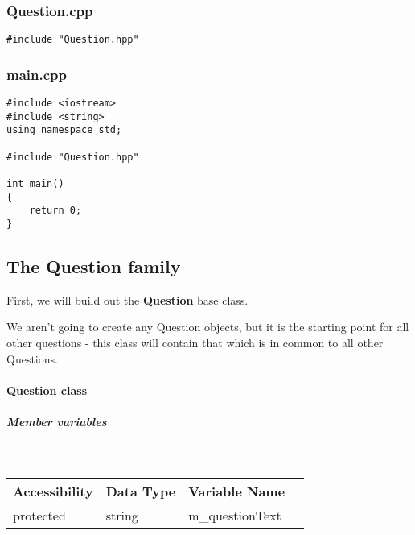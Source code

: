\documentclass[a4paper,12pt]{book}
\begin{document}
            
                \subsubsection*{Question.cpp}
\begin{lstlisting}[style=code]
#include "Question.hpp"
\end{lstlisting}

            
                \subsubsection*{main.cpp}
\begin{lstlisting}[style=code]
#include <iostream>
#include <string>
using namespace std;

#include "Question.hpp"

int main()
{
    return 0;
}

\end{lstlisting}

            \newpage
            \subsection*{The Question family}

            First, we will build out the \textbf{ Question } base class.

            We aren't going to create any Question objects, but it is the
            starting point for all other questions - this class will contain
            that which is in common to all other Questions.

                    \paragraph{ Question class }
                    
                        \subparagraph{ Member variables } ~\\
                            
                            \begin{tabular}{ l l l l }
                                Accessibility & Data Type & Variable Name  \\ \hline{}
                                protected & string & m\_questionText
                            \end{tabular}
                        
\end{document}
